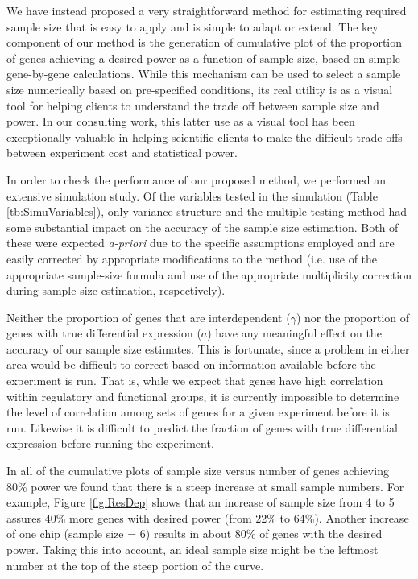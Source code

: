 \documentclass[12pt]{article}
\begin{document}
We have instead proposed a very straightforward method for
estimating required sample size that is easy to apply and is simple
to adapt or extend. The key component of our method is the
generation of cumulative plot of the proportion of genes achieving a
desired power as a function of sample size, based on simple
gene-by-gene calculations.  While this mechanism can be used to
select a sample size numerically based on pre-specified conditions,
its real utility is as a visual tool for helping clients to
understand the trade off between sample size and power.  In our
consulting work, this latter use as a visual tool has been
exceptionally valuable in helping scientific clients to make the
difficult trade offs between experiment cost and statistical power.

In order to check the performance of our proposed method, we
performed an extensive simulation study. Of the variables tested
in the simulation (Table \ref{tb:SimuVariables}), only variance
structure and the multiple testing method had some substantial
impact on the accuracy of the sample size estimation.  Both of
these were expected \textit{a-priori} due to the specific
assumptions employed and are easily corrected by appropriate
modifications to the method (i.e. use of the appropriate
sample-size formula and use of the appropriate multiplicity
correction during sample size estimation, respectively).

Neither the proportion of genes that are interdependent ($\gamma$)
nor the proportion of genes with true differential expression ($a$)
have any meaningful effect on the accuracy of our sample size
estimates.  This is fortunate, since a problem in either area would
be difficult to correct based on information available before the
experiment is run.  That is, while we expect that genes have high
correlation within regulatory and functional groups, it is currently
impossible to determine the level of correlation among sets of genes
for a given experiment before it is run.  Likewise it is difficult
to predict the fraction of genes with true differential expression
before running the experiment.

In all of the cumulative plots of sample size versus number of genes
achieving 80\% power we found that there is a steep increase at
small sample numbers. For example, Figure \ref{fig:ResDep} shows
that an increase of sample size from 4 to 5 assures 40\% more genes
with desired power (from 22\% to 64\%).  Another increase of one
chip (sample size = 6) results in about 80\% of genes with the desired
power. Taking this into account, an ideal sample size might be the
leftmost number at the top of the steep portion of the curve.
\end{document}
